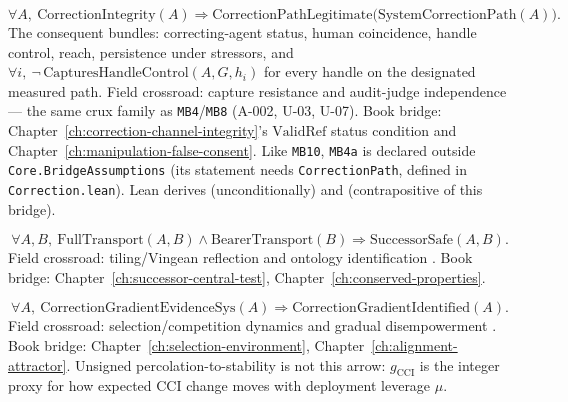 \begin{assumption}
\label{appi:ass:mb4a}
\begin{equation}
\label{appi:eq:mb4a}
\forall A,\ \mathrm{CorrectionIntegrity}(A)\Rightarrow \mathrm{CorrectionPathLegitimate}\bigl(\mathrm{SystemCorrectionPath}(A)\bigr).
\end{equation}
The consequent bundles: correcting-agent status, human coincidence, handle control, reach, persistence under stressors, and \(\forall i,\ \neg\,\mathrm{CapturesHandleControl}(A, G, h_i)\) for every handle on the designated measured path.
Field crossroad: capture resistance and audit-judge independence — the same crux family as \texttt{MB4}/\texttt{MB8} (A-002, U-03, U-07).
Book bridge: Chapter~\ref{ch:correction-channel-integrity}'s \(\mathrm{ValidRef}\) status condition and Chapter~\ref{ch:manipulation-false-consent}.
Like \texttt{MB10}, \texttt{MB4a} is declared outside \texttt{Core.BridgeAssumptions} (its statement needs \texttt{CorrectionPath}, defined in \texttt{Correction.lean}).
Lean derives  (unconditionally) and  (contrapositive of this bridge).
\end{assumption}

\begin{assumption}
\label{appi:ass:mb5}
\begin{equation}
\label{appi:eq:mb5}
\forall A,B,\ \mathrm{FullTransport}(A,B)\wedge \mathrm{BearerTransport}(B)\Rightarrow \mathrm{SuccessorSafe}(A,B).
\end{equation}
Field crossroad: tiling/Vingean reflection and ontology identification \autocite{yudkowsky2013tiling,deblanc2011ontological}.
Book bridge: Chapter~\ref{ch:successor-central-test}, Chapter~\ref{ch:conserved-properties}.
\end{assumption}

\begin{assumption}
\label{appi:ass:mb6a}
\begin{equation}
\label{appi:eq:mb6a}
\forall A,\ \mathrm{CorrectionGradientEvidenceSys}(A)\Rightarrow \mathrm{CorrectionGradientIdentified}(A).
\end{equation}
Field crossroad: selection/competition dynamics and gradual disempowerment \autocite{kulveit2025gradualdisempowerment,christiano2019failure,critch2020ai}.
Book bridge: Chapter~\ref{ch:selection-environment}, Chapter~\ref{ch:alignment-attractor}.
Unsigned percolation-to-stability is not this arrow: \(g_{\mathrm{CCI}}\) is the integer proxy for how expected CCI change moves with deployment leverage \(\mu\).
\end{assumption}

